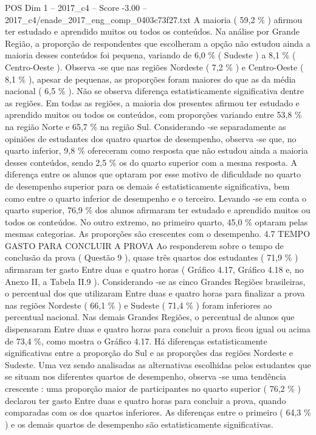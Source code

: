 \begin{textsample}{POS Dim 1 – 2017\_c4 – Score -3.00 – 2017\_c4/enade\_2017\_eng\_comp\_0403c73f27.txt}
A maioria ( 59,2 \% ) afirmou ter estudado e aprendido muitos ou todos os conteúdos.
Na análise por Grande Região, a proporção de respondentes que escolheram a opção não estudou ainda a maioria desses conteúdos foi pequena, variando de 6,0 \% ( Sudeste ) a 8,1 \% ( Centro-Oeste ).
Observa -se que nas regiões Nordeste ( 7,2 \% ) e Centro-Oeste ( 8,1 \% ), apesar de pequenas, as proporções foram maiores do que as da média nacional ( 6,5 \% ).
Não se observa diferença estatisticamente significativa dentre as regiões.
Em todas as regiões, a maioria dos presentes afirmou ter estudado e aprendido muitos ou todos os conteúdos, com proporções variando entre 53,8 \% na região Norte e 65,7 \% na região Sul.
Considerando -se separadamente as opiniões de estudantes dos quatro quartos de desempenho, observa -se que, no quarto inferior, 9,8 \% ofereceram como resposta que não estudou ainda a maioria desses conteúdos, sendo 2,5 \% os do quarto superior com a mesma resposta.
A diferença entre os alunos que optaram por esse motivo de dificuldade no quarto de desempenho superior para os demais é estatisticamente significativa, bem como entre o quarto inferior de desempenho e o terceiro.
Levando -se em conta o quarto superior, 76,9 \% dos alunos afirmaram ter estudado e aprendido muitos ou todos os conteúdos.
No outro extremo, no primeiro quarto, 45,0 \% optaram pelas mesmas categorias.
As proporções são crescentes com o desempenho. 4.7 TEMPO GASTO PARA CONCLUIR A PROVA Ao responderem sobre o tempo de conclusão da prova ( Questão 9 ), quase três quartos dos estudantes ( 71,9 \% ) afirmaram ter gasto Entre duas e quatro horas ( Gráfico 4.17, Gráfico 4.18 e, no Anexo II, a Tabela II.9 ).
Considerando -se as cinco Grandes Regiões brasileiras, o percentual dos que utilizaram Entre duas e quatro horas para finalizar a prova nas regiões Nordeste ( 66,1 \% ) e Sudeste ( 71,4 \% ) foram inferiores ao percentual nacional.
Nas demais Grandes Regiões, o percentual de alunos que dispensaram Entre duas e quatro horas para concluir a prova ficou igual ou acima de 73,4 \%, como mostra o Gráfico 4.17.
Há diferenças estatisticamente significativas entre a proporção do Sul e as proporções das regiões Nordeste e Sudeste.
Uma vez sendo analisadas as alternativas escolhidas pelos estudantes que se situam nos diferentes quartos de desempenho, observa -se uma tendência crescente : uma proporção maior de participantes no quarto superior ( 76,2 \% ) declarou ter gasto Entre duas e quatro horas para concluir a prova, quando comparadas com os dos quartos inferiores.
As diferenças entre o primeiro ( 64,3 \% ) e os demais quartos de desempenho são estatisticamente significativas.

\end{textsample}
